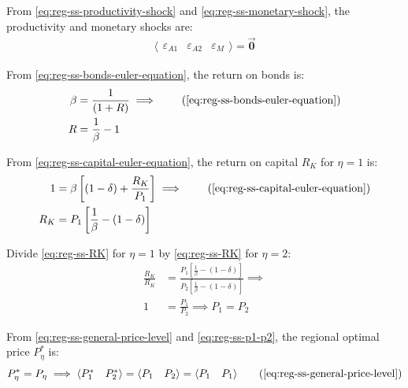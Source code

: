 \documentclass[../thesis.tex]{subfiles}
\begin{document}
	From \ref{eq:reg-ss-productivity-shock} and \ref{eq:reg-ss-monetary-shock}, the productivity and monetary shocks are:
	\begin{align}
		\langle \begin{matrix} \varepsilon_{A1} & \varepsilon_{A2} & \varepsilon_{M} \end{matrix} \rangle = \vec{\bm{0}} \label{eq:reg-ss-epsilon}
	\end{align}
	
	From \ref{eq:reg-ss-bonds-euler-equation}, the return on bonds is:
	\begin{align}
		\beta &= \frac{1}{(1 + R)} \implies \tag{\ref{eq:reg-ss-bonds-euler-equation}} \\
		R &= \frac{1}{\beta} - 1 \label{eq:reg-ss-R}
	\end{align}
	
	From \ref{eq:reg-ss-capital-euler-equation}, the return on capital $R_K$ for $\eta = 1$ is:
	\begin{align}
		1 &= \beta \left[ (1-\delta) + \frac{R_K}{P_{1}} \right] \implies \tag{\ref{eq:reg-ss-capital-euler-equation}} \\
		R_K &= P_{1} \left[ \frac{1}{\beta} - (1-\delta) \right] \label{eq:reg-ss-RK}
	\end{align}

	Divide \ref{eq:reg-ss-RK} for $\eta = 1$ by \ref{eq:reg-ss-RK} for $\eta = 2$:
	\begin{align}
		\frac{R_K}{R_K} &= \frac{P_{1} \left[ \frac{1}{\beta} - (1-\delta) \right]}{P_{2} \left[ \frac{1}{\beta} - (1-\delta) \right]} \implies \nonumber \\
		1 &= \frac{P_{1}}{P_{2}} \implies P_{1} = P_{2} \label{eq:reg-ss-p1-p2}
	\end{align}

From \ref{eq:reg-ss-general-price-level} and \ref{eq:reg-ss-p1-p2}, the regional optimal price $P_{\eta}^{\ast}$ is:
\begin{align}
	P_{\eta}^{\ast} = P_{\eta} \implies \langle \begin{matrix} P_{1}^{\ast} & P_{2}^{\ast} \end{matrix} \rangle = \langle \begin{matrix} P_{1} & P_{2} \end{matrix} \rangle = \langle \begin{matrix} P_{1} & P_{1} \end{matrix} \rangle \tag{\ref{eq:reg-ss-general-price-level}}
\end{align}
\end{document}

